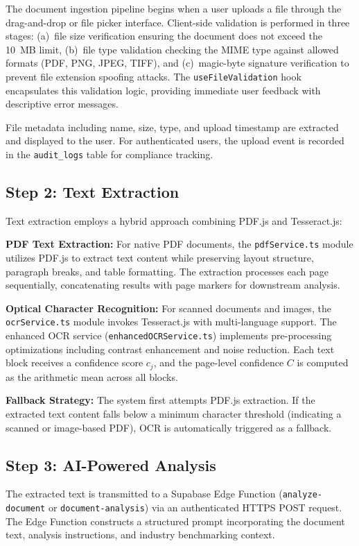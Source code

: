 \documentclass[12pt,a4paper,oneside]{report}
\begin{document}
The document ingestion pipeline begins when a user uploads a file through the drag-and-drop or file picker interface. Client-side validation is performed in three stages: (a)~file size verification ensuring the document does not exceed the 10~MB limit, (b)~file type validation checking the MIME type against allowed formats (PDF, PNG, JPEG, TIFF), and (c)~magic-byte signature verification to prevent file extension spoofing attacks. The \texttt{useFileValidation} hook encapsulates this validation logic, providing immediate user feedback with descriptive error messages.

File metadata including name, size, type, and upload timestamp are extracted and displayed to the user. For authenticated users, the upload event is recorded in the \texttt{audit\_logs} table for compliance tracking.

\subsection{Step 2: Text Extraction}

Text extraction employs a hybrid approach combining PDF.js and Tesseract.js:

\textbf{PDF Text Extraction:} For native PDF documents, the \texttt{pdfService.ts} module utilizes PDF.js to extract text content while preserving layout structure, paragraph breaks, and table formatting. The extraction processes each page sequentially, concatenating results with page markers for downstream analysis.

\textbf{Optical Character Recognition:} For scanned documents and images, the \texttt{ocrService.ts} module invokes Tesseract.js with multi-language support. The enhanced OCR service (\texttt{enhancedOCRService.ts}) implements pre-processing optimizations including contrast enhancement and noise reduction. Each text block receives a confidence score $c_j$, and the page-level confidence $C$ is computed as the arithmetic mean across all blocks.

\textbf{Fallback Strategy:} The system first attempts PDF.js extraction. If the extracted text content falls below a minimum character threshold (indicating a scanned or image-based PDF), OCR is automatically triggered as a fallback.

\subsection{Step 3: AI-Powered Analysis}

The extracted text is transmitted to a Supabase Edge Function (\texttt{analyze-document} or \texttt{document-analysis}) via an authenticated HTTPS POST request. The Edge Function constructs a structured prompt incorporating the document text, analysis instructions, and industry benchmarking context.
\end{document}
